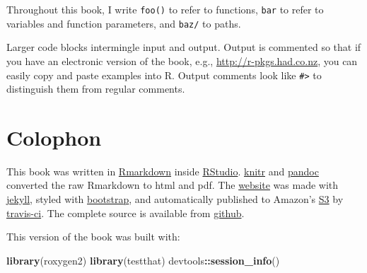 \documentclass[]{book}
\newenvironment{Shaded}{\begin{snugshade}}{\end{snugshade}}
\newcommand{\KeywordTok}[1]{\textcolor[rgb]{0.13,0.29,0.53}{\textbf{#1}}}
\newcommand{\NormalTok}[1]{#1}
\newcommand{\OperatorTok}[1]{\textcolor[rgb]{0.81,0.36,0.00}{\textbf{#1}}}
\begin{document}
Throughout this book, I write \texttt{foo()} to refer to functions, \texttt{bar} to refer to variables and function parameters, and \texttt{baz/} to paths.

Larger code blocks intermingle input and output. Output is commented so that if you have an electronic version of the book, e.g., \url{http://r-pkgs.had.co.nz}, you can easily copy and paste examples into R. Output comments look like \texttt{\#\textgreater{}} to distinguish them from regular comments.

\hypertarget{intro-colophon}{%
\section{Colophon}\label{intro-colophon}}

This book was written in \href{http://rmarkdown.rstudio.com/}{Rmarkdown} inside \href{http://www.rstudio.com/ide/}{RStudio}. \href{http://yihui.name/knitr/}{knitr} and \href{http://johnmacfarlane.net/pandoc/}{pandoc} converted the raw Rmarkdown to html and pdf. The \href{http://r-pkgs.had.co.nz}{website} was made with \href{http://jekyllrb.com/}{jekyll}, styled with \href{http://getbootstrap.com/}{bootstrap}, and automatically published to Amazon's \href{http://aws.amazon.com/s3/}{S3} by \href{https://travis-ci.org/}{travis-ci}. The complete source is available from \href{https://github.com/hadley/r-pkgs}{github}.

This version of the book was built with:

\begin{Shaded}
\begin{Highlighting}[]
\KeywordTok{library}\NormalTok{(roxygen2)}
\KeywordTok{library}\NormalTok{(testthat)}
\NormalTok{devtools}\OperatorTok{::}\KeywordTok{session_info}\NormalTok{()}
\end{Highlighting}
\end{Shaded}
\end{document}

